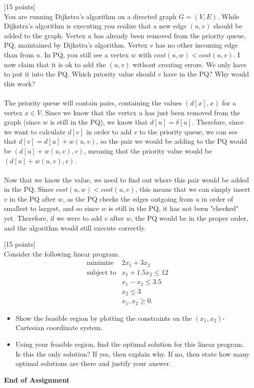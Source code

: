 \documentclass[12pt]{article}
\newcounter{ques}
\newenvironment{question}{\stepcounter{ques}{\noindent\bf Question \arabic{ques}:}}{\vspace{5mm}}
\begin{document}
	\begin{question}[15 points]\\

	You are running Dijkstra's algorithm on a directed graph $G =(V,E)$. While Dijkstra's algorithm is executing you realize that a new edge $(u,v)$ should be added to the graph. Vertex $u$ has already been removed from the priority queue, PQ, maintained by Dijkstra's algorithm. Vertex $v$ has no other incoming edge than from $u$. In PQ,   you still see a vertex $w$ with $cost(u,w) <  cost(u,v)$. I now claim that it is ok to add the
	 $(u,v)$ without creating errors. We only have to put it  into the PQ. Which priority value should $v$ have in the PQ? Why would this work?\\\\

  The priority queue will contain pairs, containing the values $(d[x], x)$ for a vertex $x\in V$. Since we know that the vertex $u$ has just been removed from the graph (since $w$ is still in the PQ), we know that $d[u]=\delta[u]$. Therefore, since we want to calculate $d[v]$ in order to add $v$ to the priority queue, we can see that $d[v] = d[u] + w(u,v)$, so the pair we would be adding to the PQ would be $(d[u]+w(u,v),v)$, meaning that the priority value would be $(d[u]+w(u,v),v)$.\\\\
  Now that we know the value, we need to find out where this pair would be added in the PQ. Since $cost(u,w)<cost(u,v)$, this means that we can simply insert $v$ in the PQ after $w$, as the PQ checks the edges outgoing from $u$ in order of smallest to largest, and so since $w$ is still in the PQ, it has not been "checked" yet. Therefore, if we were to add $v$ after $w$, the PQ would be in the proper order, and the algorithm would still execute correctly.

	\end{question}

	\begin{question}[15 points]\\
Consider the following linear program.
\begin{align*}
 & \text{minimize} & 2x_1+3x_2& \\
 & \text{subject to} & x_1+1.5x_2\leq 12\\
 &                   & x_1-x_2\leq 3.5\\
 &                   & x_2\leq 3\\
 &                   & x_1, x_2\geq 0.
\end{align*}
\begin{itemize}
    \item Show the feasible region by plotting the constraints on the $(x_1,x_2)$-Cartesian coordinate system.
    \item Using your feasible region, find the optimal solution for this linear program. Is this the only solution? If yes, then explain why. If no, then state how many optimal solutions are there and justify your answer.
\end{itemize}

\end{question}
\begin{center}
{\bf End of Assignment}
\end{center}
\end{document}

